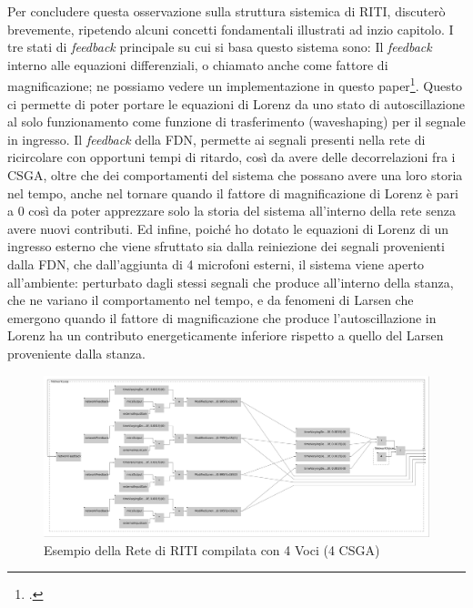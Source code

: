 Per concludere questa osservazione sulla struttura sistemica di RITI,
discuterò brevemente, ripetendo alcuni concetti fondamentali illustrati ad inzio capitolo.
I tre stati di \emph{feedback} principale su cui si basa questo sistema sono:
Il \emph{feedback} interno alle equazioni differenziali, o chiamato anche come fattore di magnificazione; 
ne possiamo vedere un implementazione in questo paper\footcite{liang_difference_2013}.
Questo ci permette di poter portare le equazioni di Lorenz da uno stato di autoscillazione al
solo funzionamento come funzione di trasferimento (waveshaping) per il segnale in ingresso.
Il \emph{feedback} della FDN, permette ai segnali presenti nella rete di ricircolare
con opportuni tempi di ritardo, così da avere delle decorrelazioni fra i CSGA, oltre che dei comportamenti del sistema
che possano avere una loro storia nel tempo, anche nel tornare quando il fattore di magnificazione di Lorenz è pari a 0
così da poter apprezzare solo la storia del sistema all'interno della rete senza avere nuovi contributi.
Ed infine, poiché ho dotato le equazioni di Lorenz di un ingresso esterno che viene sfruttato
sia dalla reiniezione dei segnali provenienti dalla FDN, che dall'aggiunta di 4 microfoni esterni,
il sistema viene aperto all'ambiente: perturbato dagli stessi segnali che produce all'interno della stanza,
che ne variano il comportamento nel tempo, e da fenomeni di Larsen che emergono quando il fattore di 
magnificazione che produce l'autoscillazione in Lorenz ha un contributo energeticamente 
inferiore rispetto a quello del Larsen proveniente dalla stanza.

\begin{figure}[h!]
\begin{center}
    \includegraphics[width=14cm]{figures/RITI4VoiceNetwork.pdf} 
    \caption {Esempio della Rete di RITI compilata con 4 Voci (4 CSGA)}
\end{center}
\end{figure}

